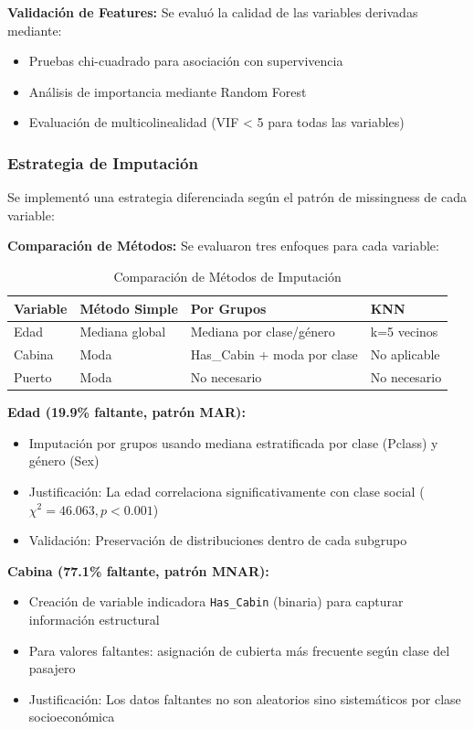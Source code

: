 \documentclass[conference]{IEEEtran}
\begin{document}
\textbf{Validación de Features:}
Se evaluó la calidad de las variables derivadas mediante:
\begin{itemize}
\item Pruebas chi-cuadrado para asociación con supervivencia
\item Análisis de importancia mediante Random Forest
\item Evaluación de multicolinealidad (VIF < 5 para todas las variables)
\end{itemize}

\subsubsection{Estrategia de Imputación}

Se implementó una estrategia diferenciada según el patrón de missingness de cada variable:

\textbf{Comparación de Métodos:}
Se evaluaron tres enfoques para cada variable:
\begin{table}[htbp]
\caption{Comparación de Métodos de Imputación}
\label{tab:imputation_methods}
\begin{center}
\begin{tabular}{|l|l|p{2.75cm}|l|}
\hline
\textbf{Variable} & \textbf{Método Simple} & \textbf{Por Grupos} & \textbf{KNN} \\
\hline
Edad & Mediana global & Mediana por clase/género & k=5 vecinos \\
Cabina & Moda & Has\_Cabin + moda por clase & No aplicable \\
Puerto & Moda & No necesario & No necesario \\
\hline
\end{tabular}
\end{center}
\end{table}

\textbf{Edad (19.9\% faltante, patrón MAR):}
\begin{itemize}
\item Imputación por grupos usando mediana estratificada por clase (Pclass) y género (Sex)
\item Justificación: La edad correlaciona significativamente con clase social ($\chi^2 = 46.063, p < 0.001$)
\item Validación: Preservación de distribuciones dentro de cada subgrupo
\end{itemize}

\textbf{Cabina (77.1\% faltante, patrón MNAR):}
\begin{itemize}
\item Creación de variable indicadora \texttt{Has\_Cabin} (binaria) para capturar información estructural
\item Para valores faltantes: asignación de cubierta más frecuente según clase del pasajero
\item Justificación: Los datos faltantes no son aleatorios sino sistemáticos por clase socioeconómica
\end{itemize}
\end{document}
